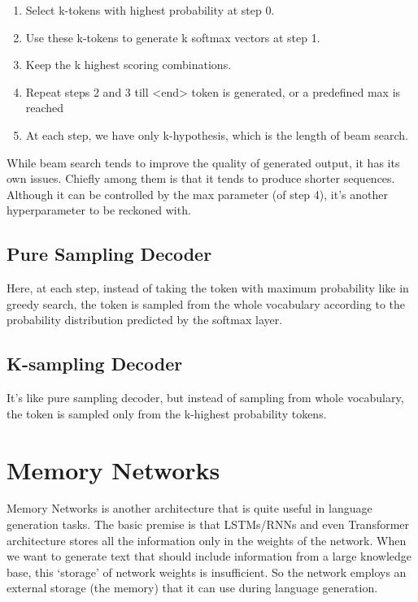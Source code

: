\documentclass[]{krantz}
\providecommand{\tightlist}{%
  \setlength{\itemsep}{0pt}\setlength{\parskip}{0pt}}
\begin{document}
\begin{enumerate}
\def\labelenumi{\arabic{enumi}.}
\tightlist
\item
  Select k-tokens with highest probability at step 0.
\item
  Use these k-tokens to generate k softmax vectors at step 1.
\item
  Keep the k highest scoring combinations.
\item
  Repeat steps 2 and 3 till \textless{}end\textgreater{} token is generated, or a predefined max is reached
\item
  At each step, we have only k-hypothesis, which is the length of beam search.
\end{enumerate}

While beam search tends to improve the quality of generated output, it has its own issues. Chiefly among them is that it tends to produce shorter sequences. Although it can be controlled by the max parameter (of step 4), it's another hyperparameter to be reckoned with.

\hypertarget{pure-sampling-decoder}{%
\subsection{Pure Sampling Decoder}\label{pure-sampling-decoder}}

Here, at each step, instead of taking the token with maximum probability like in greedy search, the token is sampled from the whole vocabulary according to the probability distribution predicted by the softmax layer.

\hypertarget{k-sampling-decoder}{%
\subsection{K-sampling Decoder}\label{k-sampling-decoder}}

It's like pure sampling decoder, but instead of sampling from whole vocabulary, the token is sampled only from the k-highest probability tokens.

\hypertarget{memory-networks}{%
\section{Memory Networks}\label{memory-networks}}

Memory Networks is another architecture that is quite useful in language generation tasks. The basic premise is that LSTMs/RNNs and even Transformer architecture stores all the information only in the weights of the network. When we want to generate text that should include information from a large knowledge base, this `storage' of network weights is insufficient. So the network employs an external storage (the memory) that it can use during language generation.
\end{document}
